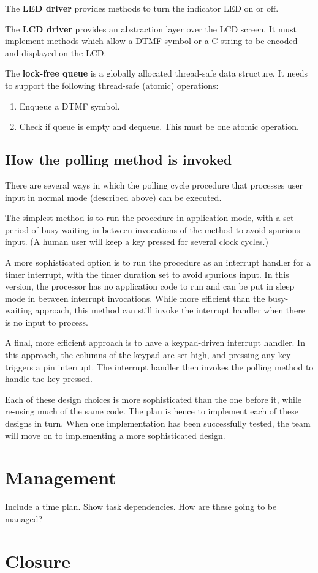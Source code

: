 \documentclass[11pt,a4paper
]{scrartcl}
\begin{document}
The \textbf{LED driver} provides methods to turn the indicator LED on or off.

The \textbf{LCD driver} provides an abstraction layer over the LCD screen. It must implement methods which allow a DTMF symbol or a C string to be encoded and
displayed on the LCD.

The \textbf{lock-free queue} is a globally allocated thread-safe data structure. It needs to support the following thread-safe (atomic) operations:
\begin{enumerate}
   \item Enqueue a DTMF symbol.
   \item Check if queue is empty and dequeue. This must be one atomic operation.
\end{enumerate}

\subsection{How the polling method is invoked}

There are several ways in which the polling cycle procedure that processes user input in normal mode (described above) can be executed.

The simplest method is to run the procedure in application mode, with a set period of busy waiting in between invocations of the method to avoid spurious input.
(A human user will keep a key pressed for several clock cycles.)

A more sophisticated option is to run the procedure as an interrupt handler for a timer interrupt, with the timer duration set to avoid spurious input. In this
version, the processor has no application code to run and can be put in sleep mode in between interrupt invocations. While more efficient than the busy-waiting
approach, this method can still invoke the interrupt handler when there is no input to process.

A final, more efficient approach is to have a keypad-driven interrupt handler. In this approach, the columns of the keypad are set high, and pressing any key
triggers a pin interrupt. The interrupt handler then invokes the polling method to handle the key pressed.

Each of these design choices is more sophisticated than the one before it, while re-using much of the same code. 
The plan is hence to implement each of these designs in turn. When one implementation has been successfully tested, the team will move on to implementing a more
sophisticated design.

\section{Management}
Include a time plan.
Show task dependencies.
How are these going to be managed?

\section{Closure}



\end{document}
